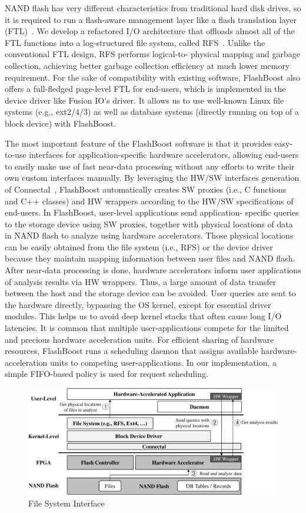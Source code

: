 NAND flash has very different characteristics from traditional hard disk drives,
so it is required to run a flash-aware management layer like a flash translation
layer (FTL)~\cite{}.  We develop a refactored I/O architecture that offloads
almost all of the FTL functions into a log-structured file system, called
RFS~\cite{}. Unlike the conventional FTL design, RFS performs logical-to-
physical mapping and garbage collection, achieving better garbage collection
efficiency at much lower memory requirement. For the sake of compatibility with
existing software, FlashBoost also offers a full-fledged page-level FTL for
end-users, which is implemented in the device driver like Fusion IO’s driver. It
allows us to use well-known Linux file systems (e.g., ext2/4/3) as well as
database systems (directly running on top of a block device) with FlashBoost.

The most important feature of the FlashBoost software is that it provides
easy-to-use interfaces for application-specific hardware accelerators, allowing
end-users to easily make use of fast near-data processing without any efforts to
write their own custom interfaces manually. By leveraging the HW/SW interfaces
generation of Connectal~\cite{}, FlashBoost automatically creates SW proxies
(i.e., C functions and C++ classes) and HW wrappers according to the HW/SW
specifications of end-users. In FlashBoost, user-level applications send
application- specific queries to the storage device using SW proxies, together
with physical locations of data in NAND flash to analyze using hardware
accelerators. Those physical locations can be easily obtained from the file
system (i.e., RFS) or the device driver because they maintain mapping
information between user files and NAND flash. After near-data processing is
done, hardware accelerators inform user applications of analysis results via HW
wrappers. Thus, a large amount of data transfer between the host and the storage
device can be avoided. User queries are sent to the hardware directly, bypassing
the OS kernel, except for essential driver modules. This helps us to avoid deep
kernel stacks that often cause long I/O latencies. It is common that multiple
user-applications compete for the limited and precious hardware acceleration
units. For efficient sharing of hardware resources, FlashBoost runs a scheduling
daemon that assigns available hardware-acceleration units to competing
user-applications. In our implementation, a simple FIFO-based policy is used for
request scheduling.

\begin{figure}[h]
	\begin{center}
	\includegraphics[width=0.4\paperwidth]{figures/software.pdf}
	\caption{File System Interface}
	\label{fig:filesystem}
	\end{center}
\end{figure}
